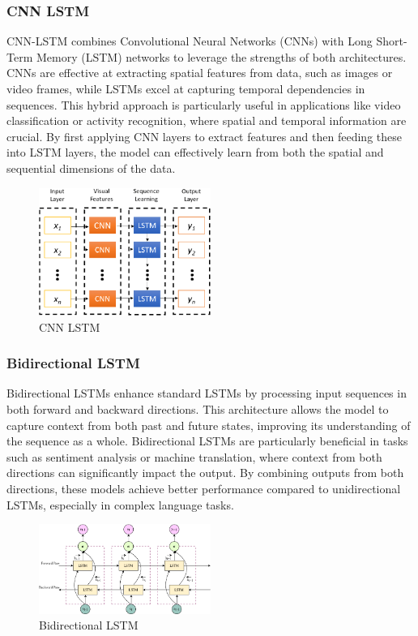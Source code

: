 \documentclass[nonacm,sigconf]{acmart}
\begin{document}
\subsubsection{\textbf{CNN LSTM}}
CNN-LSTM combines Convolutional Neural Networks (CNNs) with Long Short-Term Memory (LSTM) networks to leverage the strengths of both architectures. CNNs are effective at extracting spatial features from data, such as images or video frames, while LSTMs excel at capturing temporal dependencies in sequences. This hybrid approach is particularly useful in applications like video classification or activity recognition, where spatial and temporal information are crucial. By first applying CNN layers to extract features and then feeding these into LSTM layers, the model can effectively learn from both the spatial and sequential dimensions of the data.
\begin{figure}[h]
  \centering
  \includegraphics[width=0.5\textwidth]{LSTMs/cnn.png}
  \caption{CNN LSTM}
\end{figure}

\subsubsection{\textbf{Bidirectional LSTM}}
Bidirectional LSTMs enhance standard LSTMs by processing input sequences in both forward and backward directions. This architecture allows the model to capture context from both past and future states, improving its understanding of the sequence as a whole. Bidirectional LSTMs are particularly beneficial in tasks such as sentiment analysis or machine translation, where context from both directions can significantly impact the output. By combining outputs from both directions, these models achieve better performance compared to unidirectional LSTMs, especially in complex language tasks.
\begin{figure}[h]
  \centering
  \includegraphics[width=0.5\textwidth]{LSTMs/bidirectional.png}
  \caption{Bidirectional LSTM}
\end{figure}
\end{document}
